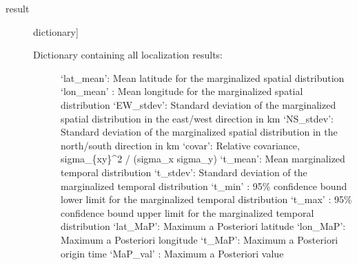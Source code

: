 \documentclass[letterpaper,10pt,english]{sphinxmanual}
\begin{document}
\begin{fulllineitems}
\begin{description}
\end{description}
\begin{description}
\item[{result}] \leavevmode{[}dictionary{]}\begin{description}
\item[{Dictionary containing all localization results:}] \leavevmode
‘lat\_mean’: Mean latitude for the marginalized spatial distribution
‘lon\_mean’ : Mean longitude for the marginalized spatial distribution
‘EW\_stdev’: Standard deviation of the marginalized spatial distribution in the east/west direction in km
‘NS\_stdev’: Standard deviation of the marginalized spatial distribution in the north/south direction in km
‘covar’: Relative covariance, sigma\_\{xy\}\textasciicircum{}2 / (sigma\_x sigma\_y)
‘t\_mean’: Mean marginalized temporal distribution
‘t\_stdev’: Standard deviation of the marginalized temporal distribution
‘t\_min’ : 95\% confidence bound lower limit for the marginalized temporal distribution
‘t\_max’ : 95\% confidence bound upper limit for the marginalized temporal distribution
‘lat\_MaP’: Maximum a Posteriori latitude
‘lon\_MaP’: Maximum a Posteriori longitude
‘t\_MaP’: Maximum a Posteriori origin time
‘MaP\_val’ : Maximum a Posteriori value

\end{description}

\end{description}

\end{fulllineitems}

\end{document}
